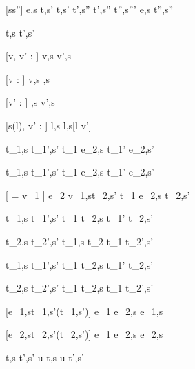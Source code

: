 [s\neq s'']
    {e,s \evaluate t,s'  \Quad
     t,s' \stride t',s''  \Quad
     t',s'' \normalise t'',s'''}
    {e,s \normalise t'',s''}





  {t,s  t',s'}

[v, v' : \tau]
  { }
  {\Edit v,s  \Edit v',s}

[v : \tau]
  { }
  {\Edit v,s \handle{\Empty} \Enter \tau,s}

[v' : \tau]
  { }
  {\Enter \tau,s  \Edit v',s}

[s(l), v' : \tau]
  { }
  {\Update l,s  \Update l,s[l \mapsto v']{}}


  {t_1,s  t_1',s'}
  {t_1 \Then e_2,s  t_1' \Then e_2,s'}

  {t_1,s  t_1',s'}
  {t_1 \Next e_2,s  t_1' \Next e_2,s'}

[ = v_1 \wedge \neg{}]
  {e_2 v_1,s\stride t_2,s'}
  {t_1 \Next e_2,s \handle{\Continue} t_2,s'}


  {t_1,s  t_1',s' }
  {t_1 \And t_2,s  t_1' \And t_2,s'}

  {t_2,s  t_2',s'}
  {t_1,s \And t_2  t_1 \And t_2',s'}


  {t_1,s  t_1',s'}
  {t_1 \Or t_2,s  t_1' \Or t_2,s'}

  {t_2,s  t_2',s' }
  {t_1 \Or t_2,s  t_1 \Or t_2',s'}


[e_1,s\evaluate t_1,s'\wedge \neg\Failing(t_1,s')]
  { }
  {e_1 \Xor e_2,s \handle{\Left} e_1,s}

[e_2,s\evaluate t_2,s'\wedge \neg\Failing(t_2,s')]
  { }
  {e_1 \Xor e_2,s \handle{\Right} e_2,s}


  {t,s  t',s'}
  {u \At t,s u \At t',s'}






